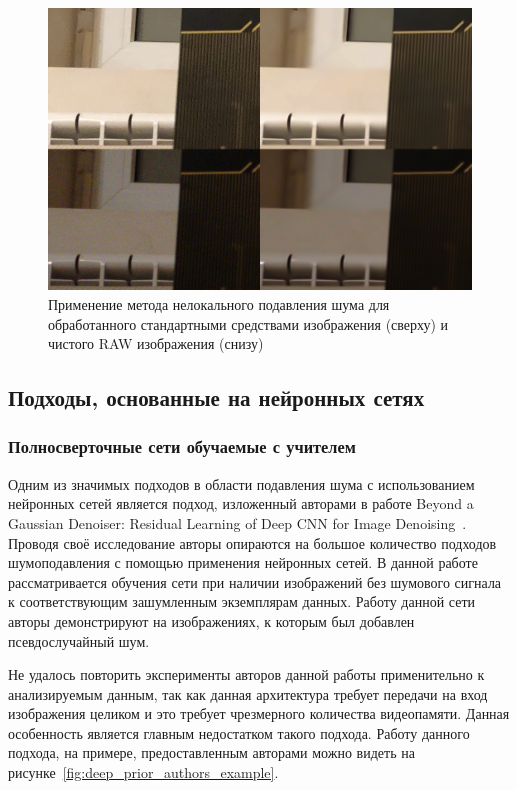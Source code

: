 \begin{figure}[h]
	\centering
	\includegraphics[width=\textwidth]{img/nlmdenoising_comparison}
	\caption{Применение метода нелокального подавления шума для обработанного стандартными средствами изображения (сверху) и чистого RAW изображения (снизу)}
	\label{fig:nlmdenoising_comparison}
\end{figure}

\subsection{Подходы, основанные на нейронных  сетях}

\subsubsection{Полносверточные сети обучаемые с учителем}

Одним из значимых подходов в области подавления шума с использованием нейронных сетей является подход, изложенный авторами в работе Beyond a Gaussian Denoiser: Residual Learning of Deep CNN for Image Denoising~\autocite{DeepPrior}. Проводя своё исследование авторы опираются на большое количество подходов шумоподавления с помощью применения нейронных сетей. В данной работе рассматривается обучения сети при наличии изображений без шумового сигнала к соответствующим зашумленным экземплярам данных. Работу данной сети авторы демонстрируют на изображениях, к которым был добавлен псевдослучайный шум.

Не удалось повторить эксперименты авторов данной работы применительно к анализируемым данным, так как данная архитектура требует передачи на вход изображения целиком и это требует чрезмерного количества видеопамяти. Данная особенность является главным недостатком такого подхода. Работу данного подхода, на примере, предоставленным авторами можно видеть на рисунке~\ref{fig:deep_prior_authors_example}.

